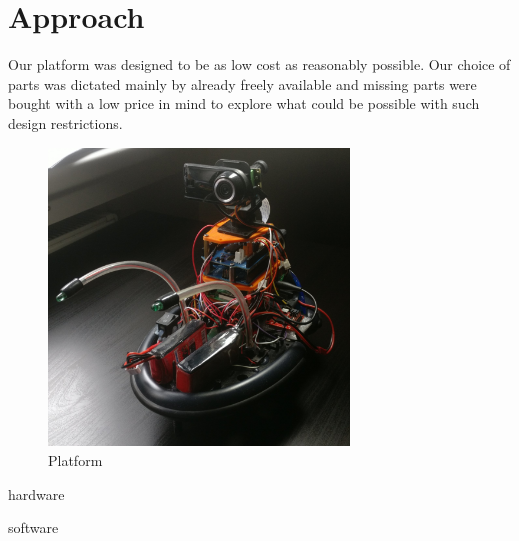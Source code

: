\documentclass[class=article, crop=false]{standalone}
\begin{document}
\chapter{Approach}\label{cha:approach}

Our platform was designed to be as low cost as reasonably possible. Our choice of parts was dictated mainly by already freely available and missing parts were bought with a low price in mind to explore what could be possible with such design restrictions.

\begin{figure}
  \centering
  \includegraphics[width=8cm]{images/garry.jpg}
  \caption{Platform}
\end{figure}

{hardware}

{software}
\end{document}
